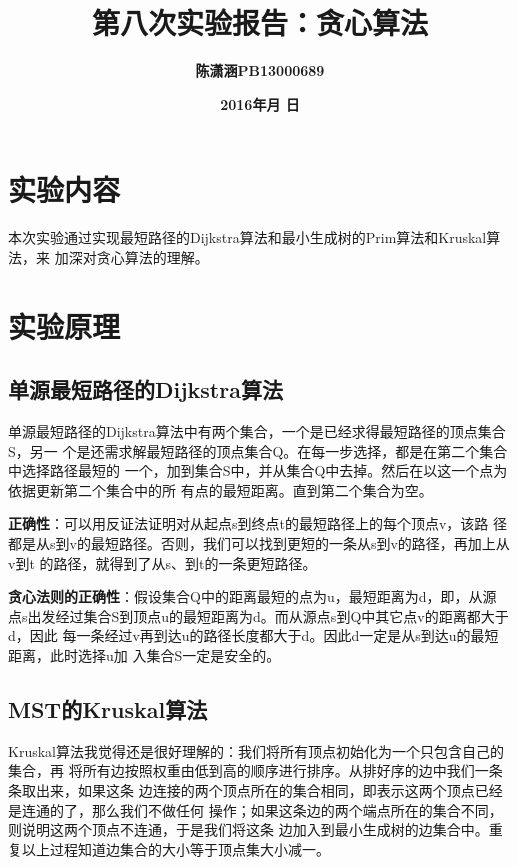 \documentclass[12pt]{article}
\begin{document}
\title{\textbf{第八次实验报告：贪心算法}}
\author{\textbf{陈潇涵}\space \textbf{PB13000689}}
\date{\textbf{2016\space 年\space 月 \space 日}}
\maketitle

\section*{实验内容}
本次实验通过实现最短路径的Dijkstra算法和最小生成树的Prim算法和Kruskal算法，来
加深对贪心算法的理解。

\section*{实验原理}
\subsection*{单源最短路径的Dijkstra算法}
单源最短路径的Dijkstra算法中有两个集合，一个是已经求得最短路径的顶点集合S，另一
个是还需求解最短路径的顶点集合Q。在每一步选择，都是在第二个集合中选择路径最短的
一个，加到集合S中，并从集合Q中去掉。然后在以这一个点为依据更新第二个集合中的所
有点的最短距离。直到第二个集合为空。

\medskip

\textbf{正确性}：可以用反证法证明对从起点s到终点t的最短路径上的每个顶点v，该路
径都是从s到v的最短路径。否则，我们可以找到更短的一条从s到v的路径，再加上从v到t
的路径，就得到了从s、到t的一条更短路径。

\medskip

\textbf{贪心法则的正确性}：假设集合Q中的距离最短的点为u，最短距离为d，即，从源
点s出发经过集合S到顶点u的最短距离为d。而从源点s到Q中其它点v的距离都大于d，因此
每一条经过v再到达u的路径长度都大于d。因此d一定是从s到达u的最短距离，此时选择u加
入集合S一定是安全的。

\subsection*{MST的Kruskal算法}
Kruskal算法我觉得还是很好理解的：我们将所有顶点初始化为一个只包含自己的集合，再
将所有边按照权重由低到高的顺序进行排序。从排好序的边中我们一条条取出来，如果这条
边连接的两个顶点所在的集合相同，即表示这两个顶点已经是连通的了，那么我们不做任何
操作；如果这条边的两个端点所在的集合不同，则说明这两个顶点不连通，于是我们将这条
边加入到最小生成树的边集合中。重复以上过程知道边集合的大小等于顶点集大小减一。
\end{document}
